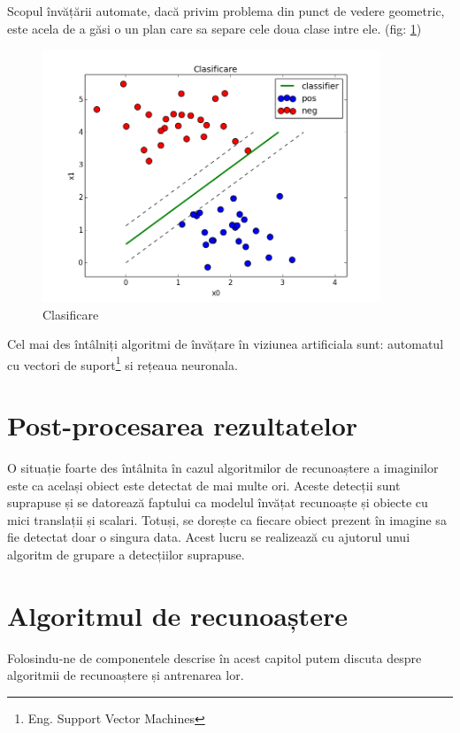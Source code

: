 Scopul învățării automate, dacă privim problema din punct de vedere geometric, este acela de a găsi o un plan care sa separe cele doua clase intre ele. (fig: \ref{fig:fig_clasificare})

\begin{figure}[h]
	\centering
		\includegraphics[width=0.90\textwidth]{imagini/fig_clasificare2.png}
	\caption{Clasificare}
	\label{fig:fig_clasificare}
\end{figure}

Cel mai des întâlniți algoritmi de învățare în viziunea artificiala sunt: automatul cu vectori de suport\cite{suykens1999least}\footnote{Eng. Support Vector Machines} si rețeaua neuronala.

\pagebreak
\section{Post-procesarea rezultatelor}

O situație foarte des întâlnita în cazul algoritmilor de recunoaștere a imaginilor este ca același obiect este detectat de mai multe ori.
Aceste detecții sunt suprapuse și se datorează faptului ca modelul învățat recunoaște și obiecte cu mici translații și scalari.
Totuși, se dorește ca fiecare obiect prezent în imagine sa fie detectat doar o singura data.
Acest lucru se realizează cu ajutorul unui algoritm de grupare a detecțiilor suprapuse.

\pagebreak
\section{Algoritmul de recunoaștere}

Folosindu-ne de componentele descrise în acest capitol putem discuta despre algoritmii de recunoaștere și antrenarea lor.

